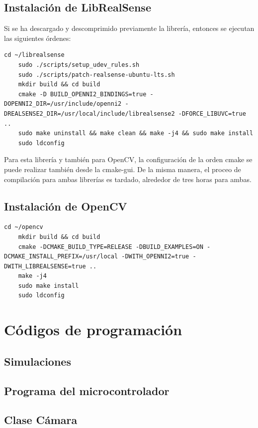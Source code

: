 \documentclass[12pt, letterpaper, oneside]{book}
\begin{document}
	\section{Instalación de LibRealSense}
	Si se ha descargado y descomprimido previamente la librería, entonces se ejecutan las siguientes órdenes:
	\begin{lstlisting}[frame=single]
	cd ~/librealsense
	sudo ./scripts/setup_udev_rules.sh
	sudo ./scripts/patch-realsense-ubuntu-lts.sh
	mkdir build && cd build
	cmake -D BUILD_OPENNI2_BINDINGS=true -DOPENNI2_DIR=/usr/include/openni2 -DREALSENSE2_DIR=/usr/local/include/librealsense2 -DFORCE_LIBUVC=true ..
	sudo make uninstall && make clean && make -j4 && sudo make install
	sudo ldconfig
	\end{lstlisting}
	Para esta librería y también para OpenCV, la configuración de la orden cmake se puede realizar también desde la cmake-gui. De la misma manera, el proceo de compilación para ambas librerías es tardado, alrededor de tres horas para ambas.
	\section{Instalación de OpenCV}
	\begin{lstlisting}[frame=single]
	cd ~/opencv
	mkdir build && cd build
	cmake -DCMAKE_BUILD_TYPE=RELEASE -DBUILD_EXAMPLES=ON -DCMAKE_INSTALL_PREFIX=/usr/local -DWITH_OPENNI2=true -DWITH_LIBREALSENSE=true ..
	make -j4
	sudo make install
	sudo ldconfig
	\end{lstlisting}
	\chapter{Códigos de programación}
	\label{cap:cod}
	\section{Simulaciones}
	\label{sec:csim}
	
	\newpage
	\section{Programa del microcontrolador}
	\label{sec:micro}
	
	\newpage
	\section{Clase Cámara}
	\label{sec:cam}
	
	
\end{document}
